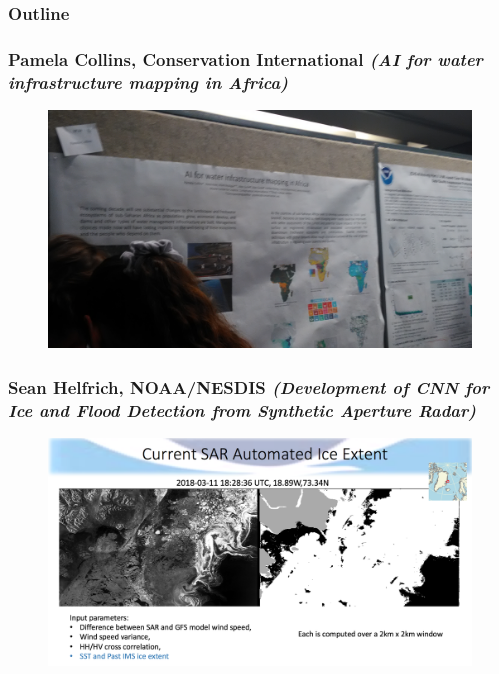 \documentclass{beamer}
\begin{document}
\begin{frame}
\frametitle{Outline} %
\tableofcontents[currentsection] %
\end{frame}

\begin{frame}
\frametitle{Pamela Collins, Conservation International \textit{(AI for water infrastructure mapping in Africa)}}
\begin{figure}
	\includegraphics[width=.9\linewidth]{figs/P_20190423_143522.jpg}
\end{figure}
\end{frame}


\begin{frame}
\frametitle{Sean Helfrich, NOAA/NESDIS \textit{(Development of CNN for Ice and Flood Detection from Synthetic Aperture Radar)}}
\begin{figure}
	\includegraphics[width=.9\linewidth]{figs/ScreenShot_SAR.png}
\end{figure}
\end{frame}
\end{document}
